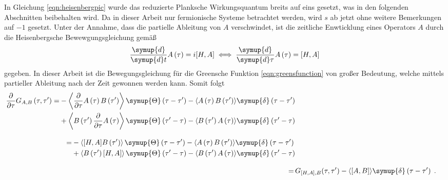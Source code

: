In Gleichung \eqref{eqn:heisenbergpic} wurde das reduzierte Planksche Wirkungsquantum breits auf eins gesetzt, was in den folgenden Abschnitten beibehalten wird.
Da in dieser Arbeit nur fermionische Systeme betrachtet werden, wird $s$ ab jetzt ohne weitere Bemerkungen auf $-1$ gesetzt.
Unter der Annahme, dass die partielle Ableitung von $A$ verschwindet, ist die zeitliche Enwticklung eines Operators 
$A$ durch die Heisenbergsche Bewewgungsgleichung gemäß 
\begin{equation}
\frac{\symup{d}}{\symup{d}t} A \left (\tau \right ) = i  [H, A] \iff \frac{\symup{d}}{\symup{d}\tau} A \left (\tau \right ) = [H, A] \label{eqn:heisenbergeom}
\end{equation}
gegeben.
In dieser Arbeit ist die Bewegungsgleichung für die Greensche Funktion \eqref{eqn:greensfunction} von großer Bedeutung, welche mittels 
partieller Ableitung nach der Zeit gewonnen werden kann.\cite{anders-fkt}
Somit folgt
\begin{align*}
    \begin{split}
    \frac{\partial}{\partial \tau} G_{A,B} \left (\tau, \tau' \right) = 
    &- \left \langle \frac{\partial}{\partial \tau}A \left (\tau \right ) B \left ( \tau' \right ) \right \rangle
    \symup{\Theta} \left ( \tau - \tau' \right) -  \langle A \left (\tau \right ) B \left ( \tau' \right ) \rangle \symup{\delta} \left ( \tau - \tau' \right)\\
    &+ \left \langle B \left ( \tau' \right ) \frac{\partial}{\partial \tau}A \left (\tau \right ) \right \rangle \symup{\Theta} \left ( \tau' - \tau \right)
    -  \langle B \left ( \tau' \right ) A \left (\tau \right ) \rangle \symup{\delta} \left ( \tau' - \tau \right)
    \end{split}
    \\[2ex]
    \begin{split}
    = &- \left \langle [H,A] B \left ( \tau' \right ) \right \rangle
    \symup{\Theta} \left ( \tau - \tau' \right) -  \langle A \left (\tau \right ) B \left ( \tau' \right ) \rangle \symup{\delta} \left ( \tau - \tau' \right)\\
    &+ \left \langle B \left ( \tau' \right ) [H,A] \right \rangle \symup{\Theta} \left ( \tau' - \tau \right)
    -  \langle B \left ( \tau' \right ) A \left (\tau \right ) \rangle \symup{\delta} \left ( \tau' - \tau \right)
    \end{split}
    \\[2ex]
    =\, & G_{[H,A],B}(\tau, \tau') - \langle [A,B] \rangle \symup{\delta} \left ( \tau - \tau' \right) \; \text{.}
\end{align*} 
